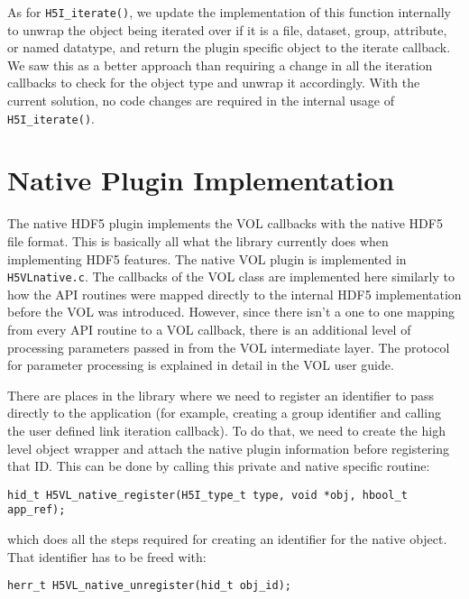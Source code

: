 As for {\tt H5I\_iterate()}, we update the implementation of this function internally to unwrap the object being iterated over if it is a file, dataset, group, attribute, or named datatype, and return the plugin specific object to the iterate callback. We saw this as a better approach than requiring a change in all the iteration callbacks to check for the object type and unwrap it accordingly. With the current solution, no code changes are required in the internal usage of {\tt H5I\_iterate()}.

\section{Native Plugin Implementation}
The native HDF5 plugin implements the VOL callbacks with the native HDF5 file format. This is basically all what the library currently does when implementing HDF5 features. The native VOL plugin is implemented in {\tt H5VLnative.c}. The callbacks of the VOL class are implemented here similarly to how the API routines were mapped directly to the internal HDF5 implementation before the VOL was introduced. However, since there isn't a one to one mapping from every API routine to a VOL callback, there is an additional level of processing parameters passed in from the VOL intermediate layer. The protocol for parameter processing is explained in detail in the VOL user guide.

There are places in the library where we need to register an identifier to pass directly to the application (for example, creating a group identifier and calling the user defined link iteration callback). To do that, we need to create the high level object wrapper and attach the native plugin information before registering that ID. This can be done by calling this private and native specific routine:
\begin{lstlisting}
hid_t H5VL_native_register(H5I_type_t type, void *obj, hbool_t app_ref);
\end{lstlisting}
which does all the steps required for creating an identifier for the native object. That identifier has to be freed with:
\begin{lstlisting}
herr_t H5VL_native_unregister(hid_t obj_id);
\end{lstlisting}

